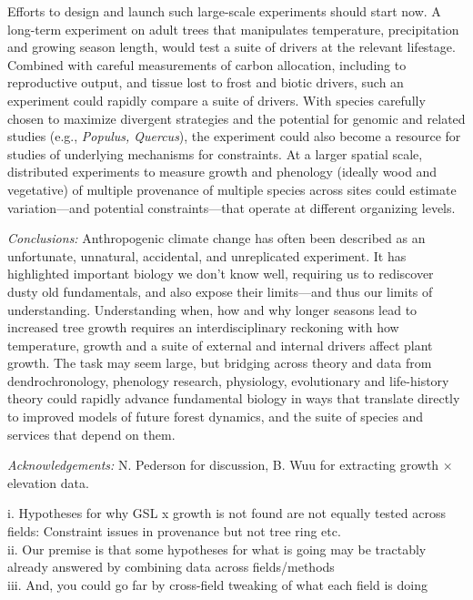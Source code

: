 \documentclass[11pt]{article}
\begin{document}
Efforts to design and launch such large-scale experiments should start now. A long-term experiment on adult trees that manipulates temperature, precipitation and growing season length, would test a suite of drivers at the relevant lifestage. %
Combined with careful measurements of carbon allocation, including to reproductive output, and tissue lost to frost and biotic drivers, such an experiment could rapidly compare a suite of drivers. With species carefully chosen to maximize divergent strategies and the potential for genomic and related studies (e.g., \emph{Populus, Quercus}), the experiment could also become a resource for studies of underlying mechanisms for constraints. At a larger spatial scale, distributed experiments to measure growth and phenology (ideally wood and vegetative) of multiple provenance of multiple species across sites could estimate variation---and potential constraints---that operate at different organizing levels. 

\emph{Conclusions:}
Anthropogenic climate change has often been described as an unfortunate, unnatural, accidental, and unreplicated experiment. It has highlighted important biology we don't know well, requiring us to rediscover dusty old fundamentals, and also expose their limits---and thus our limits of understanding. Understanding when, how and why longer seasons lead to increased tree growth requires an interdisciplinary reckoning with how temperature, growth and a suite of external and internal drivers affect plant growth. The task may seem large, but bridging across theory and data from dendrochronology, phenology research, physiology, evolutionary and life-history theory could rapidly advance fundamental biology in ways that translate directly to improved models of future forest dynamics, and the suite of species and services that depend on them. %

\emph{Acknowledgements:} N. Pederson for discussion, B. Wuu for extracting growth $\times$ elevation data. 

\iffalse

i. Hypotheses for why GSL x growth is not found are not equally tested across fields: Constraint issues in provenance but not tree ring etc.\\
ii. Our premise is that some hypotheses for what is going may be tractably already answered by combining data across fields/methods\\
iii. And, you could go far by cross-field tweaking of what each field is doing
\end{document}
